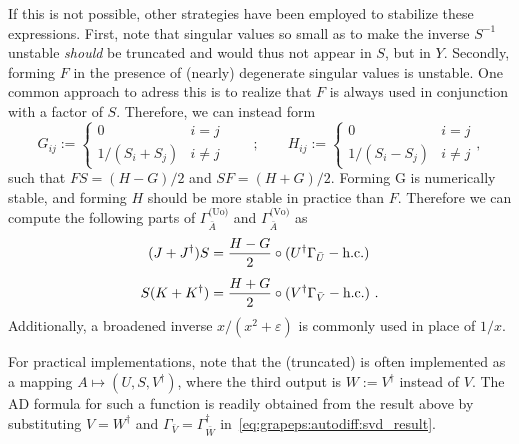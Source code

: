 If this is not possible, other strategies have been employed to stabilize these expressions.
%
First, note that singular values so small as to make the inverse $S^{-1}$ unstable \emph{should} be truncated and would thus not appear in $S$, but in $Y$.
%
Secondly, forming $F$ in the presence of (nearly) degenerate singular values is unstable.
%
One common approach to adress this is to realize that $F$ is always used in conjunction with a factor of $S$.
%
Therefore, we can instead form
\begin{equation}
    G_{ij} := \begin{cases} 0 & i = j \\ 1 / (S_i + S_j) & i \neq j \end{cases}
    \qquad ; \qquad
    H_{ij} := \begin{cases} 0 & i = j \\ 1 / (S_i - S_j) & i \neq j \end{cases}
    ,
\end{equation}
such that $FS = (H - G) / 2$ and $SF = (H + G)/2$.
%
Forming G is numerically stable, and forming $H$ should be more stable in practice than $F$.
%
Therefore we can compute the following parts of $\Gamma^\text{(Uo)}_{\bar{A}}$ and $\Gamma^\text{(Vo)}_{\bar{A}}$ as
\begin{align}
    (J + J^\dagger) S &= \frac{H - G}{2} \circ (U^\dagger \Gamma_{\bar{U}} - \text{h.c.})
    \\[1ex]
    S (K + K^\dagger) &= \frac{H + G}{2} \circ (V^\dagger \Gamma_{\bar{V}} - \text{h.c.})
    ~.
\end{align}
%
Additionally, a broadened inverse $x / (x^2 + \varepsilon)$ is commonly used in place of $1/x$.




For practical implementations, note that the (truncated)  is often implemented as a mapping $A \mapsto (U, S, V^\dagger)$, where the third output is $W := V^\dagger$ instead of $V$.
%
The AD formula for such a function is readily obtained from the result above by substituting $V = W^\dagger$ and $\Gamma_{\bar{V}} = \Gamma_{\bar{W}}^\dagger$ in~\eqref{eq:grapeps:autodiff:svd_result}.
